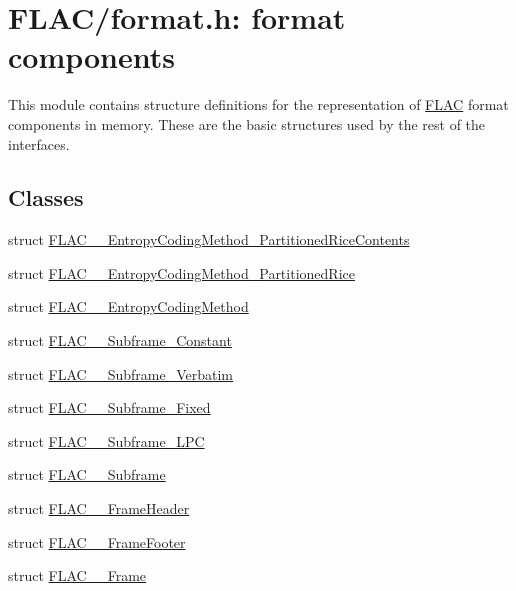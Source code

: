 \hypertarget{group__flac__format}{}\section{F\+L\+A\+C/format.h\+: format components}
\label{group__flac__format}


This module contains structure definitions for the representation of \hyperlink{namespace_f_l_a_c}{F\+L\+AC} format components in memory. These are the basic structures used by the rest of the interfaces.  


\subsection*{Classes}
\begin{DoxyCompactItemize}
\item 
struct \hyperlink{struct_f_l_a_c_____entropy_coding_method___partitioned_rice_contents}{F\+L\+A\+C\+\_\+\+\_\+\+Entropy\+Coding\+Method\+\_\+\+Partitioned\+Rice\+Contents}
\item 
struct \hyperlink{struct_f_l_a_c_____entropy_coding_method___partitioned_rice}{F\+L\+A\+C\+\_\+\+\_\+\+Entropy\+Coding\+Method\+\_\+\+Partitioned\+Rice}
\item 
struct \hyperlink{struct_f_l_a_c_____entropy_coding_method}{F\+L\+A\+C\+\_\+\+\_\+\+Entropy\+Coding\+Method}
\item 
struct \hyperlink{struct_f_l_a_c_____subframe___constant}{F\+L\+A\+C\+\_\+\+\_\+\+Subframe\+\_\+\+Constant}
\item 
struct \hyperlink{struct_f_l_a_c_____subframe___verbatim}{F\+L\+A\+C\+\_\+\+\_\+\+Subframe\+\_\+\+Verbatim}
\item 
struct \hyperlink{struct_f_l_a_c_____subframe___fixed}{F\+L\+A\+C\+\_\+\+\_\+\+Subframe\+\_\+\+Fixed}
\item 
struct \hyperlink{struct_f_l_a_c_____subframe___l_p_c}{F\+L\+A\+C\+\_\+\+\_\+\+Subframe\+\_\+\+L\+PC}
\item 
struct \hyperlink{struct_f_l_a_c_____subframe}{F\+L\+A\+C\+\_\+\+\_\+\+Subframe}
\item 
struct \hyperlink{struct_f_l_a_c_____frame_header}{F\+L\+A\+C\+\_\+\+\_\+\+Frame\+Header}
\item 
struct \hyperlink{struct_f_l_a_c_____frame_footer}{F\+L\+A\+C\+\_\+\+\_\+\+Frame\+Footer}
\item 
struct \hyperlink{struct_f_l_a_c_____frame}{F\+L\+A\+C\+\_\+\+\_\+\+Frame}

\end{DoxyCompactItemize}

